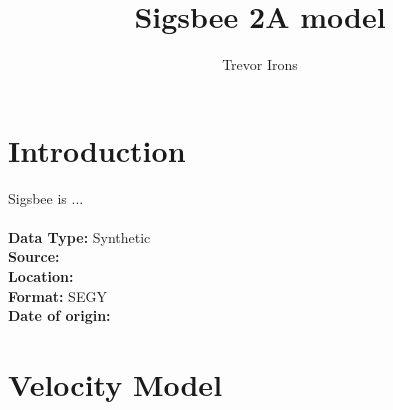 \title{Sigsbee 2A model}
\author{Trevor Irons}
\maketitle
\section{Introduction}

Sigsbee is ...
\\
\\
\textbf	{
	Data Type:} Synthetic\\
\textbf	{   
	Source:} \\
\textbf {
 	Location:} \\
\textbf	{
       	Format:} SEGY \\
\textbf{
	Date of origin:}
       
\section{Velocity Model}

